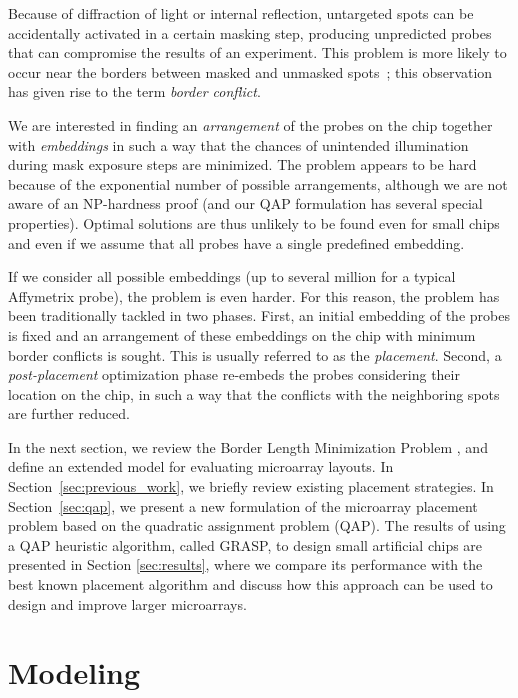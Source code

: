 \documentclass[english]{lni}
\begin{document}
Because of diffraction of light or internal reflection, untargeted spots can
be accidentally activated in a certain masking step, producing
unpredicted probes that can compromise the results of an experiment. This
problem is more likely to occur near the borders between masked and unmasked
spots~\cite{FODOR91}; this observation has given rise to the term
\emph{border conflict}.

We are interested in finding an \emph{arrangement} of the probes on the chip
together with \emph{embeddings} in such a way that the chances of unintended
illumination during mask exposure steps are minimized. The problem appears to
be hard because of the exponential number of possible arrangements, although
we are not aware of an NP-hardness proof (and our QAP formulation has several
special properties). Optimal solutions are thus unlikely to be found even
for small chips and even if we assume that all probes have a single predefined
embedding.

If we consider all possible embeddings (up to several million for a
typical Affymetrix probe), the problem is even harder.
For this reason, the problem has been traditionally tackled in two phases.
First, an initial embedding of the probes is fixed and an arrangement of these
embeddings on the chip with minimum border conflicts is sought. This is
usually referred to as the \emph{placement}. Second, a \emph{post-placement}
optimization phase re-embeds the probes considering their location on the chip,
in such a way that the conflicts with the neighboring spots are further
reduced.

In the next section, we review the Border Length Minimization Problem
\cite{HANNENHALLI02}, and define an extended model for evaluating microarray
layouts. In Section~\ref{sec:previous_work}, we briefly review existing
placement strategies. In Section~\ref{sec:qap}, we present a new formulation
of the microarray placement problem based on the quadratic assignment problem (QAP). The
results of using a QAP heuristic algorithm, called GRASP, to design small
artificial chips are presented in Section \ref{sec:results}, where we
compare its performance with the best known placement algorithm and
discuss how this approach can be used to design and improve larger microarrays.

\section{Modeling}
\label{sec:model}
\end{document}
